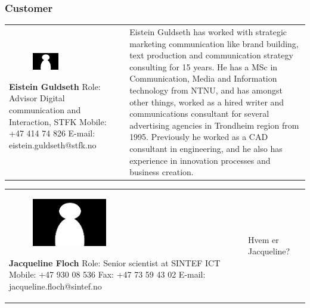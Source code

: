 \documentclass[11pt]{book}
\begin{document}
\subsubsection{Customer}
\begin{table}[H]
\centering
\begin{tabular}{ p{7cm} p{7cm} }
\parbox{7cm}{
\begin{figure}[H]
      \includegraphics[width=0.4\textwidth]{Figures/Person.png}
      \label{fig:partners_customer_eistein}
\end{figure}
\textbf{Eistein Guldseth}\\
Role: Advisor Digital communication and Interaction, STFK\\
Mobile: +47 414 74 826\\
E-mail: eistein.guldseth@stfk.no} & \parbox{7cm}{
Eistein Guldseth has worked with strategic marketing communication like brand building, text production and communication strategy consulting for 15 years. He has a MSc in Communication, Media and Information technology from NTNU, and has amongst other things, worked as a hired writer and communications consultant for several advertising agencies in Trondheim region from 1995. Previously he worked as a CAD consultant in engineering, and he also has experience in innovation processes and business creation.\cite{bioEisteinGuldseth}
}
\end{tabular}
\label{tab:partners_customer_eistein}
\end{table}

\begin{table}[H]
\centering
\begin{tabular}{ p{7cm} p{7cm} }
\parbox{7cm}{
\begin{figure}[H]
      \includegraphics[width=0.4\textwidth]{Figures/Person.png}
      \label{fig:partners_customer_jacqueline}
\end{figure}
\textbf{Jacqueline Floch}\\
Role: Senior scientist at SINTEF ICT\\
Mobile: +47 930 08 536\\
Fax: +47 73 59 43 02\\
E-mail: jacqueline.floch@sintef.no} & \parbox{7cm}{Hvem er Jacqueline?}
\end{tabular}
\label{tab:partners_customer_jacqueline}
\end{table}
\end{document}
